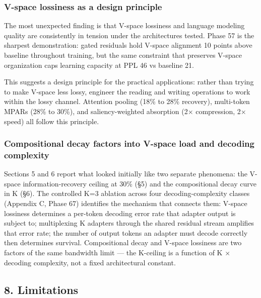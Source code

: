 \subsubsection{V-space lossiness as a design principle}\label{v-space-lossiness-as-a-design-principle}

The most unexpected finding is that V-space lossiness and language modeling quality are consistently in tension under the architectures tested. Phase 57 is the sharpest demonstration: gated residuals hold V-space alignment 10 points above baseline throughout training, but the same constraint that preserves V-space organization caps learning capacity at PPL 46 vs baseline 21.

This suggests a design principle for the practical applications: rather than trying to make V-space less lossy, engineer the reading and writing operations to work within the lossy channel. Attention pooling (18\% to 28\% recovery), multi-token MPARs (28\% to 30\%), and saliency-weighted absorption (2× compression, 2× speed) all follow this principle.

\subsubsection{Compositional decay factors into V-space load and decoding complexity}\label{compositional-decay-factors-into-v-space-load-and-decoding-complexity}

Sections 5 and 6 report what looked initially like two separate phenomena: the V-space information-recovery ceiling at 30\% (§5) and the compositional decay curve in K (§6). The controlled K=3 ablation across four decoding-complexity classes (Appendix C, Phase 67) identifies the mechanism that connects them: V-space lossiness determines a per-token decoding error rate that adapter output is subject to; multiplexing K adapters through the shared residual stream amplifies that error rate; the number of output tokens an adapter must decode correctly then determines survival. Compositional decay and V-space lossiness are two factors of the same bandwidth limit --- the K-ceiling is a function of K × decoding complexity, not a fixed architectural constant.

\subsection{8. Limitations}\label{limitations}

